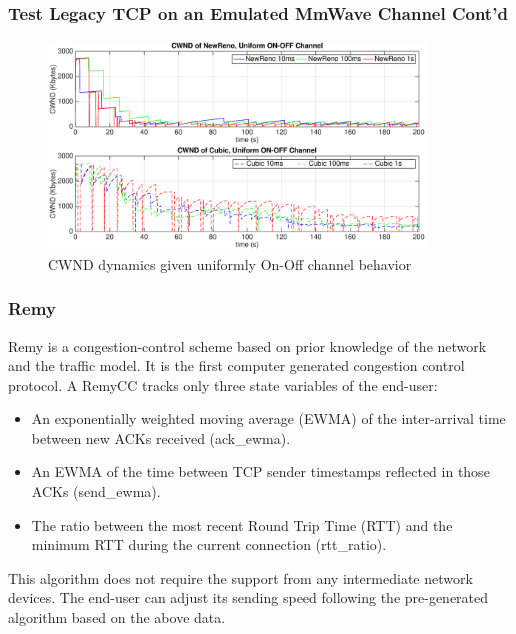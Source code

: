 \documentclass{beamer}
\begin{document}
\begin{frame}
\frametitle{Test Legacy TCP on an Emulated MmWave Channel Cont'd}
\begin{figure}
\centering
\includegraphics[width=10cm]{3.eps}
\caption{CWND dynamics given uniformly On-Off channel behavior}
\label{3rd}
\end{figure}

\end{frame}
\begin{frame}
\frametitle{Remy}
Remy is a congestion-control scheme based on prior knowledge of the network and the traffic model. It is the first computer generated congestion control protocol. A RemyCC tracks only three state variables of the end-user:
\begin{itemize}
\item An exponentially weighted moving average (EWMA) of the inter-arrival time between new ACKs received (ack\_ewma).
\item An EWMA of the time between TCP sender timestamps reflected in those ACKs (send\_ewma).
\item The ratio between the most recent Round Trip Time (RTT) and the minimum RTT during the current connection (rtt\_ratio).
\end{itemize}
This algorithm does not require the support from any intermediate network devices. The end-user can adjust its sending speed following the pre-generated algorithm based on the above data.
\end{frame}
\end{document}
